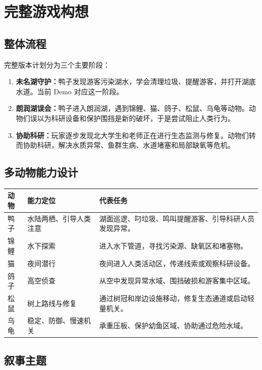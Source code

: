 \documentclass[UTF8,a4paper,12pt]{ctexart}
\begin{document}
\section{完整游戏构想}

\subsection{整体流程}

完整版本计划分为三个主要阶段：

\begin{enumerate}
  \item \textbf{未名湖守护：}鸭子发现游客污染湖水，学会清理垃圾、提醒游客，并打开湖底水道。当前 Demo 对应这一阶段。
  \item \textbf{朗润湖误会：}鸭子进入朗润湖，遇到锦鲤、猫、鸽子、松鼠、乌龟等动物。动物们误以为科研设备和保护围挡是新的破坏，于是尝试阻止人类行为。
  \item \textbf{协助科研：}玩家逐步发现北大学生和老师正在进行生态监测与修复。动物们转而协助科研，解决水质异常、鱼群生病、水道堵塞和局部缺氧等危机。
\end{enumerate}

\subsection{多动物能力设计}

\begin{longtable}{p{2.6cm}p{4cm}p{7.4cm}}
\toprule
动物 & 能力定位 & 代表任务 \\
\midrule
\endhead
鸭子 & 水陆两栖、引导人类注意 & 湖面巡逻、叼垃圾、鸣叫提醒游客、引导科研人员发现异常。 \\
锦鲤 & 水下探索 & 进入水下管道，寻找污染源、缺氧区和堵塞物。 \\
猫 & 夜间潜行 & 夜间进入人类活动区，传递线索或观察科研设备。 \\
鸽子 & 高空侦查 & 从空中发现异常水域、围挡破损和游客集中区域。 \\
松鼠 & 树上路线与修复 & 通过树冠和岸边设施移动，修复生态通道或启动轻量机关。 \\
乌龟 & 稳定、防御、慢速机关 & 承重压板、保护幼鱼区域、协助通过危险水域。 \\
\bottomrule
\end{longtable}

\subsection{叙事主题}
\end{document}
